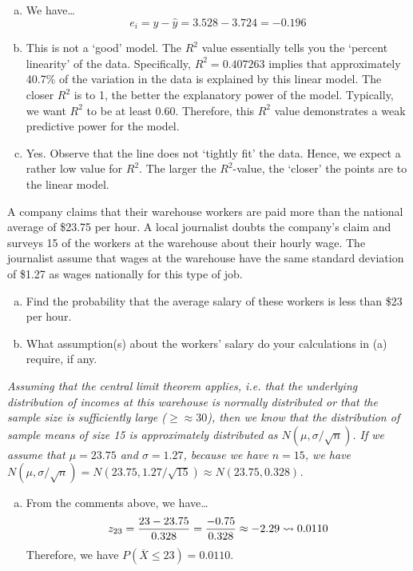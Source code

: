 \documentclass[12pt,letterpaper]{exam}
\begin{document}
\begin{questions}
{\begin{enumerate}[(a)]
\item We have\dots
	\[
	e_i= y - \widehat{y}= 3.528 - 3.724= -0.196
	\]

\item This is not a `good' model. The $R^2$ value essentially tells you the `percent linearity' of the data. Specifically, $R^2= 0.407263$ implies that approximately 40.7\% of the variation in the data is explained by this linear model. The closer $R^2$ is to 1, the better the explanatory power of the model. Typically, we want $R^2$ to be at least 0.60. Therefore, this $R^2$ value demonstrates a weak predictive power for the model. \pspace

\item Yes. Observe that the line does not `tightly fit' the data. Hence, we expect a rather low value for $R^2$. The larger the $R^2$-value, the `closer' the points are to the linear model. 
\end{enumerate}
}



\newpage
\question[10] A company claims that their warehouse workers are paid more than the national average of \$23.75 per hour. A local journalist doubts the company's claim and surveys 15 of the workers at the warehouse about their hourly wage. The journalist assume that wages at the warehouse have the same standard deviation of \$1.27 as wages nationally for this type of job.
	\begin{enumerate}[(a)]
	\item Find the probability that the average salary of these workers is less than \$23 per hour.
	\item What assumption(s) about the workers' salary do your calculations in (a) require, if any. 
	\end{enumerate} \pspace

\sol 
{\itshape Assuming that the central limit theorem applies, i.e. that the underlying distribution of incomes at this warehouse is normally distributed or that the sample size is sufficiently large ($\geq \approx 30$), then we know that the distribution of sample means of size 15 is approximately distributed as $N(\mu, \sigma/\sqrt{n})$. If we assume that $\mu= 23.75$ and $\sigma= 1.27$, because we have $n= 15$, we have $N(\mu, \sigma/\sqrt{n})= N(23.75, 1.27/\sqrt{15}) \approx N(23.75, 0.328)$. 
\begin{enumerate}[(a)]
\item From the comments above, we have\dots
	\[
	z_{23}= \dfrac{23 - 23.75}{0.328}= \dfrac{-0.75}{0.328} \approx -2.29 \rightsquigarrow 0.0110
	\]
Therefore, we have $P(\overline{X} \leq 23)= 0.0110$. \pspace


\end{enumerate}}
\end{questions}
\end{document}

